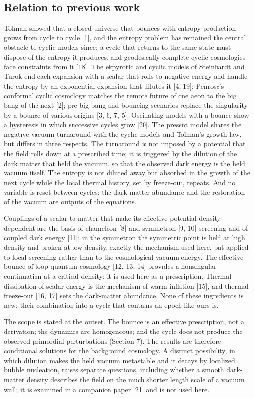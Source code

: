 \documentclass[pdflatex,sn-mathphys-num]{sn-jnl}
\begin{document}
\subsection{Relation to previous work}
Tolman showed that a closed universe that bounces with entropy production grows from cycle to cycle [1], and the entropy problem has remained the central obstacle to cyclic models since: a cycle that returns to the same state must dispose of the entropy it produces, and geodesically complete cyclic cosmologies face constraints from it [18]. The ekpyrotic and cyclic models of Steinhardt and Turok end each expansion with a scalar that rolls to negative energy and handle the entropy by an exponential expansion that dilutes it [4, 19]; Penrose's conformal cyclic cosmology matches the remote future of one aeon to the big bang of the next [2]; pre-big-bang and bouncing scenarios replace the singularity by a bounce of various origins [3, 6, 7, 5]. Oscillating models with a bounce show a hysteresis in which successive cycles grow [20]. The present model shares the negative-vacuum turnaround with the cyclic models and Tolman's growth law, but differs in three respects. The turnaround is not imposed by a potential that the field rolls down at a prescribed time; it is triggered by the dilution of the dark matter that held the vacuum, so that the observed dark energy is the held vacuum itself. The entropy is not diluted away but absorbed in the growth of the next cycle while the local thermal history, set by freeze-out, repeats. And no variable is reset between cycles: the dark-matter abundance and the restoration of the vacuum are outputs of the equations.

Couplings of a scalar to matter that make its effective potential density dependent are the basis of chameleon [8] and symmetron [9, 10] screening and of coupled dark energy [11]; in the symmetron the symmetric point is held at high density and broken at low density, exactly the mechanism used here, but applied to local screening rather than to the cosmological vacuum energy. The effective bounce of loop quantum cosmology [12, 13, 14] provides a nonsingular continuation at a critical density; it is used here as a prescription. Thermal dissipation of scalar energy is the mechanism of warm inflation [15], and thermal freeze-out [16, 17] sets the dark-matter abundance. None of these ingredients is new; their combination into a cycle that contains an epoch like ours is.

The scope is stated at the outset. The bounce is an effective prescription, not a derivation; the dynamics are homogeneous; and the cycle does not produce the observed primordial perturbations (Section 7). The results are therefore conditional solutions for the background cosmology. A distinct possibility, in which dilution makes the held vacuum metastable and it decays by localized bubble nucleation, raises separate questions, including whether a smooth dark-matter density describes the field on the much shorter length scale of a vacuum wall; it is examined in a companion paper [21] and is not used here.
\end{document}
